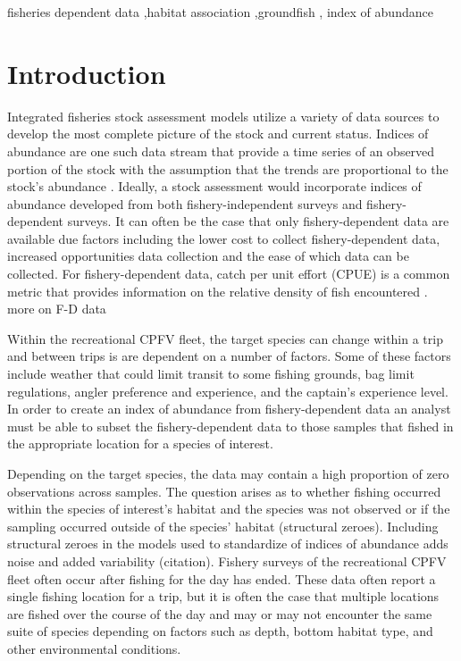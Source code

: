 \documentclass[
  12pt,
  authoryear,
  preprint,
  3p]{elsarticle}
\begin{document}
\begin{frontmatter}
\begin{keyword}
    fisheries dependent data \sep habitat
association \sep groundfish \sep 
    index of abundance
\end{keyword}
\end{frontmatter}\ifdefined\Shaded\renewenvironment{Shaded}{\begin{tcolorbox}[borderline west={3pt}{0pt}{shadecolor}, interior hidden, breakable, enhanced, boxrule=0pt, sharp corners, frame hidden]}{\end{tcolorbox}}\fi

\hypertarget{introduction}{%
\section{Introduction}\label{introduction}}

Integrated fisheries stock assessment models utilize a variety of data
sources to develop the most complete picture of the stock and current
status. Indices of abundance are one such data stream that provide a
time series of an observed portion of the stock with the assumption that
the trends are proportional to the stock's abundance
\citep{Harley:2001:CUE}. Ideally, a stock assessment would incorporate
indices of abundance developed from both fishery-independent surveys and
fishery-dependent surveys. It can often be the case that only
fishery-dependent data are available due factors including the lower
cost to collect fishery-dependent data, increased opportunities data
collection and the ease of which data can be collected. For
fishery-dependent data, catch per unit effort (CPUE) is a common metric
that provides information on the relative density of fish encountered
\citep{Maunder:2004:SCE}. more on F-D data

Within the recreational CPFV fleet, the target species can change within
a trip and between trips is are dependent on a number of factors. Some
of these factors include weather that could limit transit to some
fishing grounds, bag limit regulations, angler preference and
experience, and the captain's experience level. In order to create an
index of abundance from fishery-dependent data an analyst must be able
to subset the fishery-dependent data to those samples that fished in the
appropriate location for a species of interest.

Depending on the target species, the data may contain a high proportion
of zero observations across samples. The question arises as to whether
fishing occurred within the species of interest's habitat and the
species was not observed or if the sampling occurred outside of the
species' habitat (structural zeroes). Including structural zeroes in the
models used to standardize of indices of abundance adds noise and added
variability (citation). Fishery surveys of the recreational CPFV fleet
often occur after fishing for the day has ended. These data often report
a single fishing location for a trip, but it is often the case that
multiple locations are fished over the course of the day and may or may
not encounter the same suite of species depending on factors such as
depth, bottom habitat type, and other environmental conditions.
\end{document}
